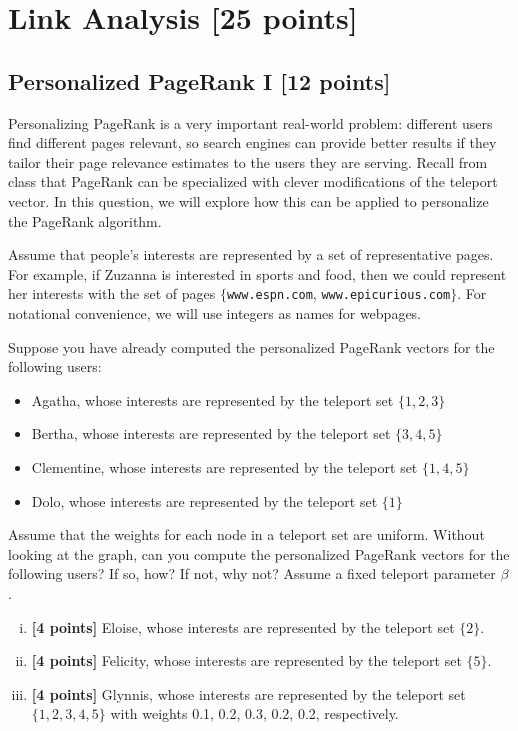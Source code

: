 
\section{Link Analysis [25 points]}

\subsection{Personalized PageRank I [12 points]}
Personalizing PageRank is a very important real-world problem: different users
find different pages relevant, so search engines can provide better results if
they tailor their page relevance estimates to the users they are serving. Recall
from class that PageRank can be specialized with clever modifications of the
teleport vector. In this question, we will explore how this can be applied to
personalize the PageRank algorithm.

Assume that people's interests are represented by a set of representative
pages. For example, if Zuzanna is interested in sports and food, then we could
represent her interests with the set of pages $\{$\texttt{www.espn.com},
\texttt{www.epicurious.com}$\}$. For notational convenience, we will use
integers as names for webpages.

Suppose you have already computed the personalized PageRank vectors for the following users:
\vspace{-0.25cm}
\begin{itemize}\setlength\itemsep{0pt}
\item Agatha, whose interests are represented by the teleport set $\{1,2,3\}$
\item Bertha, whose interests are represented by the teleport set $\{3,4,5\}$
\item Clementine, whose interests are represented by the teleport set $\{1,4,5\}$
\item Dolo, whose interests are represented by the teleport set $\{1\}$
\end{itemize}

Assume that the weights for each node in a teleport set are uniform.  Without
looking at the graph, can you compute the personalized PageRank vectors for the
following users? If so, how? If not, why not? Assume a fixed teleport parameter
$\beta$.

\vspace{-0.25cm}
\begin{enumerate}[i.]
\item \textbf{[4 points]} Eloise, whose interests are represented by the teleport set $\{2\}$.

\item \textbf{[4 points]} Felicity, whose interests are represented by the teleport set $\{5\}$.

\item \textbf{[4 points]} Glynnis, whose interests are represented by the teleport set $\{1,2,3,4,5\}$ with weights 0.1, 0.2, 0.3, 0.2, 0.2, respectively.
\end{enumerate}

